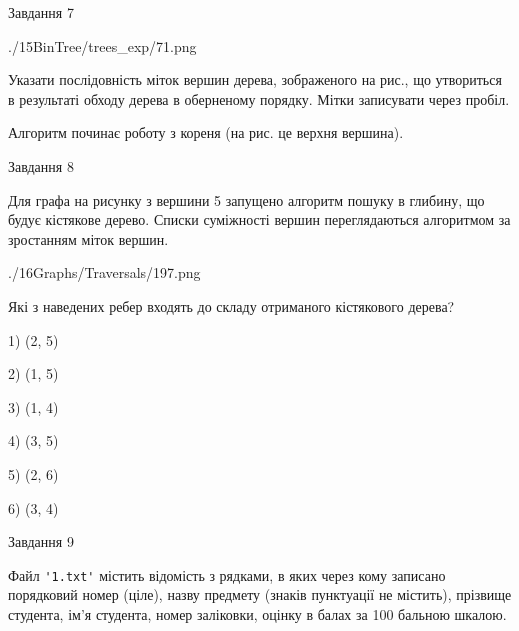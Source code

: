 \documentclass[12pt, ukrainian]{article}
\def\code#1{\Verb!#1!}
\begin{document}
{\vspace{10mm}\par

\newpage
\begin{minipage}[t]{9.7cm}
               
{\begin{center}Завдання {7}\end{center}}
\vspace{-6mm}

\begin{center}
	{./15BinTree/trees_exp/71.png}
\end{center}
Указати послідовність міток вершин дерева, зображеного на рис., що утвориться в результаті обходу дерева в оберненому порядку. Мітки записувати через пробіл.\par Алгоритм починає роботу з кореня (на рис. це верхня вершина).\par

\end{minipage}
\vline \hspace{8mm}
\begin{minipage}[t]{8.0cm}
               
{\begin{center}Завдання {8}\end{center}}
\vspace{-6mm}
Для графа на рисунку з вершини 5 запущено алгоритм пошуку в глибину, що будує кістякове дерево. Списки суміжності вершин переглядаються алгоритмом за зростанням міток вершин.\par
\begin{center}
	{./16Graphs/Traversals/197.png}
\end{center}
\par Які з наведених ребер входять до складу отриманого кістякового дерева?\par
1) (2, 5)\par
2) (1, 5)\par
3) (1, 4)\par
4) (3, 5)\par
5) (2, 6)\par
6) (3, 4)\par
{\vskip 15pt} \par

\end{minipage}

               
{\begin{center}Завдання {9}\end{center}}
\vspace{-6mm}
Файл \code{'1.txt'} містить відомість з рядками, в яких через кому записано поряд\-ковий номер (ціле), назву предмету (знаків пунктуації не містить), прізвище студента, ім'я студента, номер заліковки, оцінку в балах за 100 бальною шкалою.

}
\end{document}

